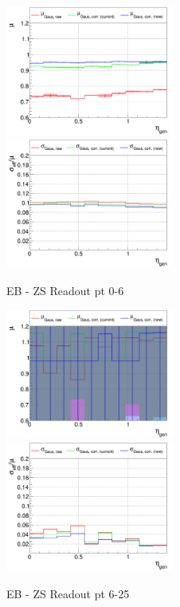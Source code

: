 
\begin{figure}
\includegraphics[width=0.495\textwidth]{./ECAL_plots/plotsPU/EB/ZS/pdf/GENETA/EBZS_GENETA_0000_0006_MuOverBins.pdf}
\includegraphics[width=0.495\textwidth]{./ECAL_plots/plotsPU/EB/ZS/pdf/GENETA/EBZS_GENETA_0000_0006_EffSigmaOverBins.pdf}
\caption{EB - ZS Readout pt 0-6}
\end{figure}

\begin{figure}
\includegraphics[width=0.495\textwidth]{./ECAL_plots/plotsPU/EB/ZS/pdf/GENETA/EBZS_GENETA_0006_0025_MuOverBins.pdf}
\includegraphics[width=0.495\textwidth]{./ECAL_plots/plotsPU/EB/ZS/pdf/GENETA/EBZS_GENETA_0006_0025_EffSigmaOverBins.pdf}
\caption{EB - ZS Readout pt 6-25}
\end{figure}



